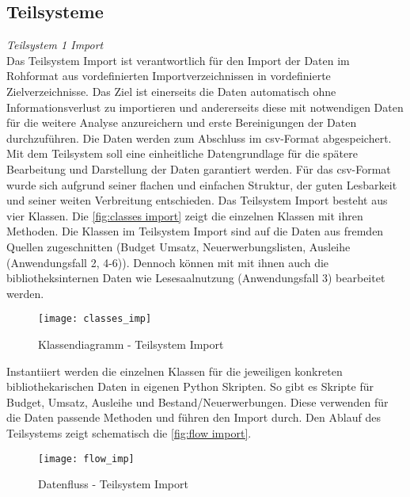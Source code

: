     \subsection{Teilsysteme}
    \label{chap:five_one_three}
    \textit{Teilsystem 1 Import}\\
    Das Teilsystem Import ist verantwortlich für den Import der Daten im Rohformat aus vordefinierten Importverzeichnissen 
    in vordefinierte Zielverzeichnisse. Das Ziel ist einerseits die Daten automatisch ohne Informationsverlust zu importieren 
    und andererseits diese mit notwendigen Daten für die weitere Analyse anzureichern und erste Bereinigungen der Daten durchzuführen. 
    Die Daten werden zum Abschluss im csv-Format abgespeichert. Mit dem Teilsystem soll eine einheitliche Datengrundlage für die spätere 
    Bearbeitung und Darstellung der Daten garantiert werden. Für das csv-Format wurde sich aufgrund seiner flachen und einfachen Struktur, der guten Lesbarkeit
    und seiner weiten Verbreitung entschieden.
    Das Teilsystem Import besteht aus vier Klassen. Die \autoref{fig:classes import} zeigt die einzelnen Klassen mit ihren Methoden.
    Die Klassen im Teilsystem Import sind auf die Daten aus fremden Quellen zugeschnitten
    (Budget Umsatz, Neuerwerbungslisten, Ausleihe (Anwendungsfall 2, 4-6)). Dennoch können mit mit ihnen auch die bibliotheksinternen Daten
    wie Lesesaalnutzung (Anwendungsfall 3) bearbeitet werden. 
    \begin{figure}[H]
        \centering
            \texttt{[image: classes\_imp]}
            \caption{Klassendiagramm - Teilsystem Import}
            \label{fig:classes import}
    \end{figure}

    Instantiiert werden die einzelnen Klassen für die jeweiligen konkreten bibliothekarischen Daten in eigenen Python Skripten. 
    So gibt es Skripte für Budget, Umsatz, Ausleihe und Bestand/Neuerwerbungen. Diese verwenden für die Daten passende Methoden
    und führen den Import durch.
    Den Ablauf des Teilsystems zeigt schematisch die \autoref{fig:flow import}.

    \begin{figure}[H]
        \centering
            \texttt{[image: flow\_imp]}
            \caption{Datenfluss - Teilsystem Import}
            \label{fig:flow import}
    \end{figure}

